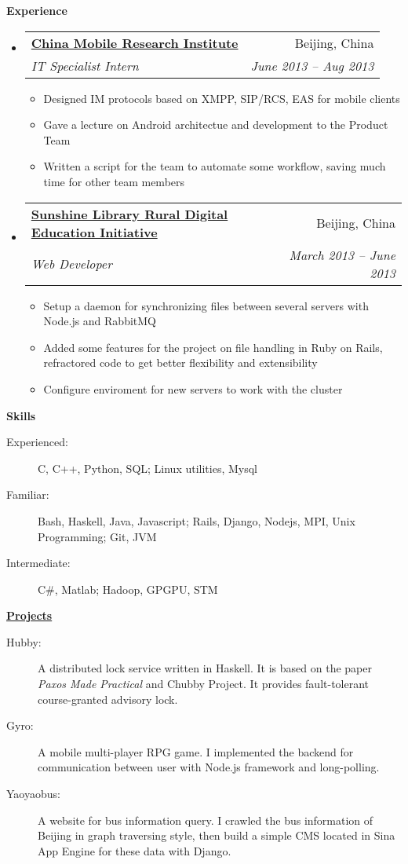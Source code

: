 \documentclass[letterpaper,11pt]{article}
\makeatletter
\newcommand{\resitem}[1]{\item #1 \vspace{-2pt}}
\newcommand{\resheading}[1]{{\large \colorbox{mygrey}{\begin{minipage}{\textwidth}{\textbf{#1 \vphantom{p\^{E}}}}\end{minipage}}}}
\newcommand{\ressubheading}[4]{
\begin{tabular*}{6.5in}{l@{\extracolsep{\fill}}r}
		\textbf{#1} & #2 \\
		\textit{#3} & \textit{#4} \\
\end{tabular*}\vspace{-6pt}}
\makeatother
\begin{document}
\resheading{Experience}
	\begin{itemize}
		\item 
			\ressubheading{\href{http://labs.chinamobile.com/}{China Mobile Research Institute}}{Beijing, China}
				{IT Specialist Intern}{June 2013 -- Aug 2013}
				{ \footnotesize
				\begin{itemize}

						\resitem{Designed IM protocols based on XMPP, SIP/RCS, EAS for mobile clients}
						\resitem{Gave a lecture on Android architectue and development to the Product Team}
						\resitem{Written a script for the team to automate some workflow, saving much time for other team members}
				\end{itemize}
				}
		\item 
			\ressubheading{\href{http://www.sunshine-library.org}{Sunshine Library Rural Digital Education Initiative}}{Beijing, China}{Web Developer}{March 2013 -- June 2013}
				{ \footnotesize
				\begin{itemize}
						\resitem{Setup a daemon for synchronizing files between several servers with Node.js and RabbitMQ}
						\resitem{Added some features for the project on file handling in Ruby on Rails, refractored code to get better flexibility and extensibility}
						\resitem{Configure enviroment for new servers to work with the cluster}
				\end{itemize}
				}
	\end{itemize}  %

\resheading{Skills}
	\begin{description}
	\item[Experienced:] { \footnotesize C, C++, Python, SQL; Linux utilities, Mysql}
	\item[Familiar:] { \footnotesize Bash, Haskell, Java, Javascript; Rails, Django, Nodejs, MPI, Unix Programming; Git, JVM}
	\item[Intermediate:] { \footnotesize C\#, Matlab; Hadoop, GPGPU, STM}

	\end{description} %

\resheading{\href{http://www.derekhildreth.com/portfolio.php}{Projects}}

\begin{description}
	\item[Hubby:] { \footnotesize A distributed lock service written in Haskell. It is based on the paper \emph{Paxos Made Practical} and Chubby Project. It provides fault-tolerant course-granted advisory lock.} 

	\item[Gyro:] { \footnotesize A mobile multi-player RPG game. I implemented the backend for communication between user with Node.js framework and long-polling.}

	\item[Yaoyaobus:] { \footnotesize A website for bus information query. I crawled the bus information of Beijing in graph traversing style, then build a simple CMS located in Sina App Engine for these data with Django.}
\end{description}
\end{document}
